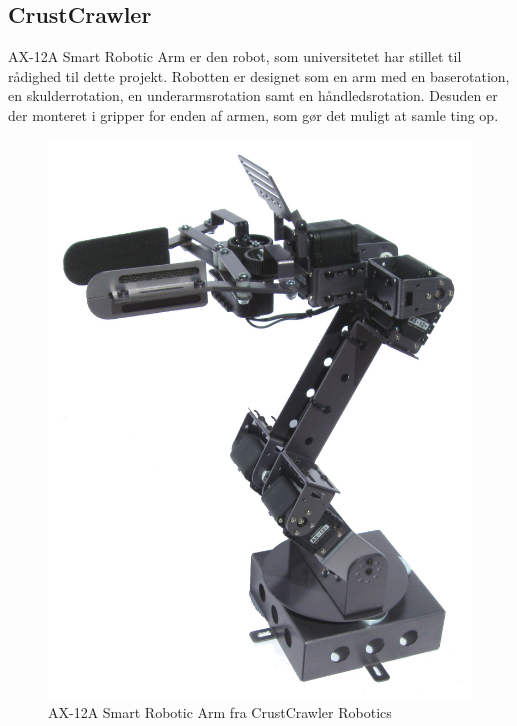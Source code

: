 \subsection{CrustCrawler}

AX-12A Smart Robotic Arm er den robot, som universitetet har stillet til rådighed til dette projekt. Robotten er designet som en arm med en baserotation, en skulderrotation, en underarmsrotation samt en håndledsrotation. Desuden er der monteret i gripper for enden af armen, som gør det muligt at samle ting op. \\


\begin{figure}[h]
\centering
\includegraphics[scale=0.50]{images/crustCrawler}
\caption{AX-12A Smart Robotic Arm fra CrustCrawler Robotics}
\label{fig:crustcrawler}
\end{figure}

